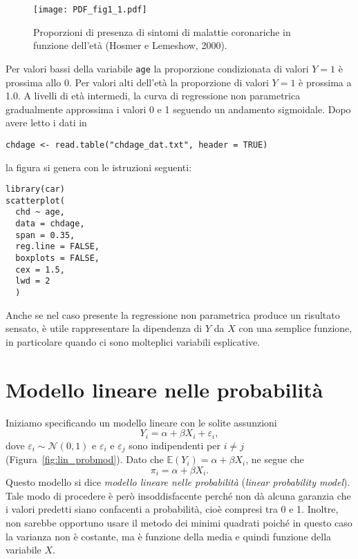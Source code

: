 \begin{figure}[h!]
  \begin{center}
    \texttt{[image: PDF\_fig1\_1.pdf]}
  \end{center}
\caption{Proporzioni di presenza di sintomi di malattie coronariche in funzione dell'età (Hosmer e Lemeshow, 2000).}
\label{fig:hosmer_1}
\end{figure}
\noindent
Per valori bassi della variabile {\tt age} la proporzione condizionata di valori $Y=1$ è prossima allo 0. Per valori alti dell'età la proporzione di valori $Y=1$ è prossima a 1.0. A livelli di età intermedi, la curva di regressione non parametrica gradualmente approssima i valori 0 e 1 seguendo un andamento sigmoidale. Dopo avere letto i dati in \R\;
\begin{lstlisting}
chdage <- read.table("chdage_dat.txt", header = TRUE)
\end{lstlisting}
la figura si genera con le istruzioni seguenti: 
\begin{lstlisting}
library(car) 
scatterplot(
  chd ~ age, 
  data = chdage, 
  span = 0.35, 
  reg.line = FALSE, 
  boxplots = FALSE, 
  cex = 1.5, 
  lwd = 2
  )
\end{lstlisting}
Anche se nel caso presente la regressione non parametrica produce un risultato sensato, è utile rappresentare la dipendenza di $Y$ da $X$ con una semplice funzione, in particolare quando ci sono molteplici variabili esplicative.

\section{Modello lineare nelle probabilità}

Iniziamo specificando un modello lineare con le solite assunzioni
  \[
  Y_i = \alpha + \beta X_i + \varepsilon_i,
  \]
dove $\varepsilon_i \sim \mathcal{N}(0, 1)$ e $\varepsilon_i$ e $\varepsilon_j$ sono indipendenti per $i \neq j$ (Figura~\ref{fig:lin_probmod}). 
Dato che $\mathbb{E}(Y_i) = \alpha + \beta X_i$, ne segue che
  \[
  \pi_i = \alpha + \beta X_i.
  \]
Questo modello si dice \emph{modello lineare nelle probabilità} (\emph{linear probability model}). 
Tale modo di procedere è però insoddisfacente perché non dà alcuna garanzia che i valori predetti siano confacenti a probabilità, cioè compresi tra 0 e 1. 
Inoltre, non sarebbe opportuno usare il metodo dei minimi quadrati poiché in questo caso la varianza non è costante, ma è funzione della media e quindi funzione della variabile $X$.

